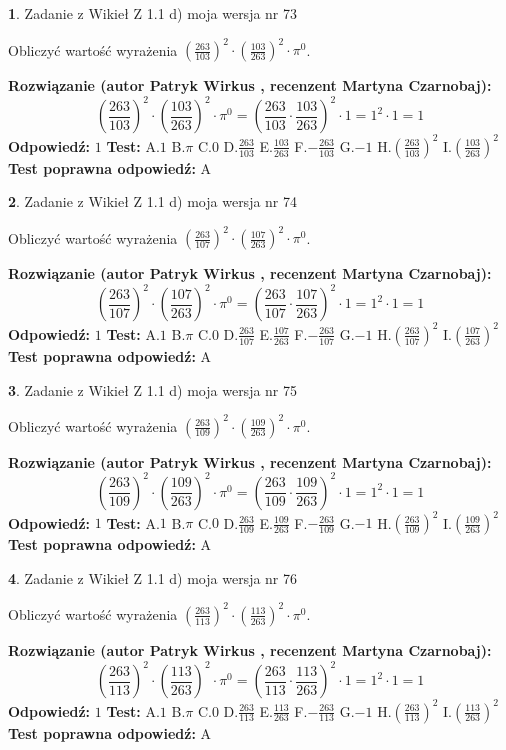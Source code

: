 \documentclass[12pt, a4paper]{article}
\theoremstyle{definition} %
\newtheorem{zad}{}
\newcommand{\zadStart}[1]{\begin{zad}#1\newline}
\newcommand{\zadStop}{\end{zad}}
\newcommand{\rozwStart}[2]{\noindent \textbf{Rozwiązanie (autor #1 , recenzent #2): }\newline}
\newcommand{\rozwStop}{\newline}
\newcommand{\odpStart}{\noindent \textbf{Odpowiedź:}\newline}
\newcommand{\odpStop}{\newline}
\newcommand{\testStart}{\noindent \textbf{Test:}\newline}
\newcommand{\testStop}{\newline}
\newcommand{\kluczStart}{\noindent \textbf{Test poprawna odpowiedź:}\newline}
\newcommand{\kluczStop}{\newline}
\begin{document}
\zadStart{Zadanie z Wikieł Z 1.1 d) moja wersja nr 73}

Obliczyć wartość wyrażenia $(\frac{263}{103})^{2} \cdot (\frac{103}{263})^{2} \cdot \pi^{0}$.
\zadStop
\rozwStart{Patryk Wirkus}{Martyna Czarnobaj}
$$(\frac{263}{103})^{2} \cdot (\frac{103}{263})^{2} \cdot \pi^{0} = (\frac{263}{103} \cdot \frac{103}{263})^{2} \cdot 1 = 1^{2} \cdot 1 = 1$$
\rozwStop
\odpStart
$1$
\odpStop
\testStart
A.$1$ B.$\pi$ C.$0$ D.$\frac{263}{103}$ E.$\frac{103}{263}$
F.$-\frac{263}{103}$ G.$-1$
H.$(\frac{263}{103})^{2}$
I.$(\frac{103}{263})^{2}$
\testStop
\kluczStart
A
\kluczStop



\zadStart{Zadanie z Wikieł Z 1.1 d) moja wersja nr 74}

Obliczyć wartość wyrażenia $(\frac{263}{107})^{2} \cdot (\frac{107}{263})^{2} \cdot \pi^{0}$.
\zadStop
\rozwStart{Patryk Wirkus}{Martyna Czarnobaj}
$$(\frac{263}{107})^{2} \cdot (\frac{107}{263})^{2} \cdot \pi^{0} = (\frac{263}{107} \cdot \frac{107}{263})^{2} \cdot 1 = 1^{2} \cdot 1 = 1$$
\rozwStop
\odpStart
$1$
\odpStop
\testStart
A.$1$ B.$\pi$ C.$0$ D.$\frac{263}{107}$ E.$\frac{107}{263}$
F.$-\frac{263}{107}$ G.$-1$
H.$(\frac{263}{107})^{2}$
I.$(\frac{107}{263})^{2}$
\testStop
\kluczStart
A
\kluczStop



\zadStart{Zadanie z Wikieł Z 1.1 d) moja wersja nr 75}

Obliczyć wartość wyrażenia $(\frac{263}{109})^{2} \cdot (\frac{109}{263})^{2} \cdot \pi^{0}$.
\zadStop
\rozwStart{Patryk Wirkus}{Martyna Czarnobaj}
$$(\frac{263}{109})^{2} \cdot (\frac{109}{263})^{2} \cdot \pi^{0} = (\frac{263}{109} \cdot \frac{109}{263})^{2} \cdot 1 = 1^{2} \cdot 1 = 1$$
\rozwStop
\odpStart
$1$
\odpStop
\testStart
A.$1$ B.$\pi$ C.$0$ D.$\frac{263}{109}$ E.$\frac{109}{263}$
F.$-\frac{263}{109}$ G.$-1$
H.$(\frac{263}{109})^{2}$
I.$(\frac{109}{263})^{2}$
\testStop
\kluczStart
A
\kluczStop



\zadStart{Zadanie z Wikieł Z 1.1 d) moja wersja nr 76}

Obliczyć wartość wyrażenia $(\frac{263}{113})^{2} \cdot (\frac{113}{263})^{2} \cdot \pi^{0}$.
\zadStop
\rozwStart{Patryk Wirkus}{Martyna Czarnobaj}
$$(\frac{263}{113})^{2} \cdot (\frac{113}{263})^{2} \cdot \pi^{0} = (\frac{263}{113} \cdot \frac{113}{263})^{2} \cdot 1 = 1^{2} \cdot 1 = 1$$
\rozwStop
\odpStart
$1$
\odpStop
\testStart
A.$1$ B.$\pi$ C.$0$ D.$\frac{263}{113}$ E.$\frac{113}{263}$
F.$-\frac{263}{113}$ G.$-1$
H.$(\frac{263}{113})^{2}$
I.$(\frac{113}{263})^{2}$
\testStop
\kluczStart
A
\kluczStop
\end{document}
